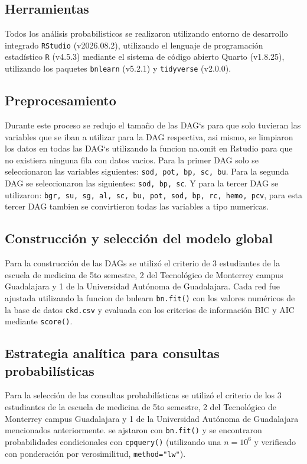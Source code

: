 \documentclass{Academic}
\begin{document}
\subsection{Herramientas}
Todos los análisis probabilisticos se realizaron utilizando entorno de desarrollo 
integrado \texttt{RStudio} (v2026.08.2), utilizando el lenguaje de programación 
estadístico \texttt{R} (v4.5.3) \cite{R} mediante el sistema de código abierto 
Quarto (v1.8.25), utilizando los paquetes \texttt{bnlearn} (v5.2.1)\cite{Bnlearn} 
y \texttt{tidyverse} (v2.0.0).

\subsection{Preprocesamiento}
Durante este proceso se redujo el tamaño de las DAG`s para que solo tuvieran las variables que se iban a utilizar para la DAG respectiva, asi mismo, se limpiaron los datos en todas las DAG`s utilizando la funcion na.omit en Rstudio para que no existiera ninguna fila con datos vacios. Para la primer DAG solo se seleccionaron las variables siguientes: \texttt{sod, pot, bp, sc, bu}. Para la segunda DAG se seleccionaron las siguientes: \texttt{sod, bp, sc}. Y para la tercer DAG se utilizaron: \texttt{bgr, su, sg, al, sc, bu, pot, sod, bp, rc, hemo, pcv}, para esta tercer DAG tambien se convirtieron todas las variables a tipo numericas.

\subsection{Construcción y selección del modelo global}
Para la construcción de las DAGs se utilizó el criterio de 3 estudiantes de la escuela de 
medicina de 5to semestre, 2 del Tecnológico de Monterrey campus Guadalajara y 1 de 
la Universidad Autónoma de Guadalajara. Cada red fue ajustada utilizando la funcion de 
bnlearn \texttt{bn.fit()} con los valores numéricos de la base de datos \texttt{ckd.csv}
y evaluada con los criterios de información BIC y AIC mediante \texttt{score()}.

\subsection{Estrategia analítica para consultas probabilísticas}
Para la selección de las consultas probabilísticas se utilizó el criterio de los 3 estudiantes de la escuela de 
medicina de 5to semestre, 2 del Tecnológico de Monterrey campus Guadalajara y 1 de 
la Universidad Autónoma de Guadalajara mencionados anteriormente. se ajstaron con \texttt{bn.fit()} y 
se encontraron probabilidades condicionales con \texttt{cpquery()} (utilizando una \(n=10^{6}\) y verificado con ponderación por
verosimilitud, \texttt{method="lw"}).
\end{document}
